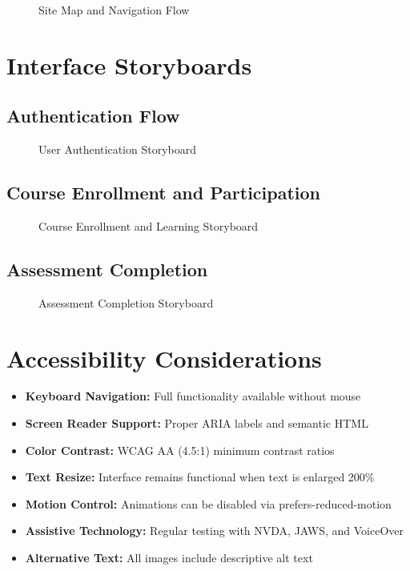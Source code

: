 \documentclass[a4paper, 11pt]{scrreprt}
\begin{document}
\begin{figure}[ht]
    \centering
    \caption{Site Map and Navigation Flow}
\end{figure}

\section{Interface Storyboards}

\subsection{Authentication Flow}
\begin{figure}[ht]
    \centering
    \caption{User Authentication Storyboard}
\end{figure}

\subsection{Course Enrollment and Participation}
\begin{figure}[ht]
    \centering
    \caption{Course Enrollment and Learning Storyboard}
\end{figure}

\subsection{Assessment Completion}
\begin{figure}[ht]
    \centering
    \caption{Assessment Completion Storyboard}
\end{figure}

\section{Accessibility Considerations}
\begin{itemize}
    \item \textbf{Keyboard Navigation:} Full functionality available without mouse
    \item \textbf{Screen Reader Support:} Proper ARIA labels and semantic HTML
    \item \textbf{Color Contrast:} WCAG AA (4.5:1) minimum contrast ratios
    \item \textbf{Text Resize:} Interface remains functional when text is enlarged 200\%
    \item \textbf{Motion Control:} Animations can be disabled via prefers-reduced-motion
    \item \textbf{Assistive Technology:} Regular testing with NVDA, JAWS, and VoiceOver
    \item \textbf{Alternative Text:} All images include descriptive alt text
\end{itemize}
\end{document}
